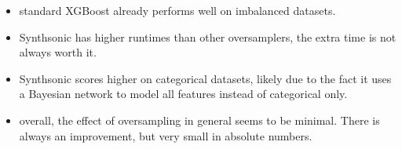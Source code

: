     \begin{itemize}
        \item standard XGBoost already performs well on imbalanced datasets.
        \item Synthsonic has higher runtimes than other oversamplers, the extra time is not always worth it.
        \item Synthsonic scores higher on categorical datasets, likely due to the fact it uses a Bayesian network to model all features instead of categorical only.
        \item overall, the effect of oversampling in general seems to be minimal. There is always an improvement, but very small in absolute numbers.
    \end{itemize}